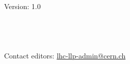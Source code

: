 

\thispagestyle{empty}%

\begin{fullwidth}
\sffamily
{
  \Large
  \fontsize{18}{24}\selectfont 
  \@title
}\\
\vspace{1\baselineskip}
{\Large 
\noindent Version: 1.0 \\
\vspace{1\baselineskip}
\noindent
\@date\\
\vspace{1\baselineskip}
\noindent
 \\
~\\
%


~\\
\noindent Contact editors: \href{mailto:lhc-lp-admin@cern.ch}{lhc-llp-admin@cern.ch}
}\\
\end{fullwidth}
\vspace*{\fill}

